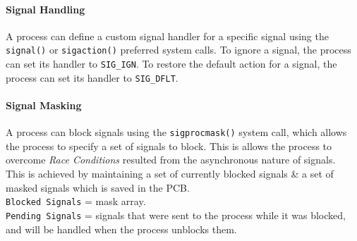 \documentclass[openany,12pt]{book}
\begin{document}
\paragraph{Signal Handling}
A process can define a custom signal handler for a specific signal using the \texttt{signal()} or \texttt{sigaction()} {\color{gray}preferred} system calls.
To ignore a signal, the process can set its handler to \texttt{SIG\_IGN}. To restore the default action for a signal, the process can set its handler to \texttt{SIG\_DFLT}.

\paragraph{Signal Masking}
A process can block signals using the \texttt{sigprocmask()} system call, which allows the process to specify a set of signals to block. This is allows the process to overcome \textit{Race Conditions} resulted from the asynchronous nature of signals.\\
\indent This is achieved by maintaining a set of currently blocked signals \& a set of masked signals which is saved in the {\color{blue}PCB}.\\
\texttt{Blocked Signals} = mask array.\\
\texttt{Pending Signals} = signals that were sent to the process while it was blocked, and will be handled when the process unblocks them.

\newpage
\end{document}

